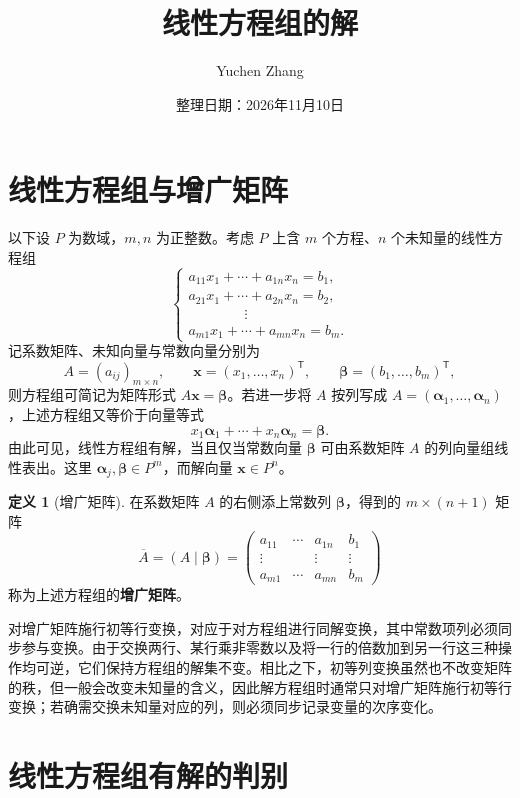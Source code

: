 \documentclass[UTF8, fontset=fandol, a4paper, 12pt]{ctexart}
\title{线性方程组的解}
\author{Yuchen Zhang}
\date{整理日期：2026年11月10日}
\makeatletter
\newcommand{\vx}{\boldsymbol{x}}
\newcommand{\vb}{\boldsymbol{\beta}}
\newcommand{\va}{\boldsymbol{\alpha}}
\theoremstyle{definition}
\newtheorem{definition}{定义}[section]
\renewcommand{\maketitle}{%
  \begin{center}
    {\LARGE\bfseries \@title\par}\vspace{0.6em}
    \@author\par\vspace{0.2em}
    {\small \@date\par}
  \end{center}
}
\makeatother
\begin{document}
\maketitle

\section{线性方程组与增广矩阵}

以下设 $P$ 为数域，$m,n$ 为正整数。考虑 $P$ 上含 $m$ 个方程、$n$ 个未知量的线性方程组
\begin{equation}\label{eq:system}
 \begin{cases}
 a_{11}x_1+\cdots+a_{1n}x_n=b_1,\\
 a_{21}x_1+\cdots+a_{2n}x_n=b_2,\\
 \hspace{4em}\vdots\\
 a_{m1}x_1+\cdots+a_{mn}x_n=b_m.
 \end{cases}
\end{equation}
记系数矩阵、未知向量与常数向量分别为
\[
 A=(a_{ij})_{m\times n},\qquad
 \vx=(x_1,\ldots,x_n)^{\mathsf T},\qquad
 \vb=(b_1,\ldots,b_m)^{\mathsf T},
\]
则方程组可简记为矩阵形式 $A\vx=\vb$。若进一步将 $A$ 按列写成 $A=(\va_1,\ldots,\va_n)$，上述方程组又等价于向量等式
\[
 x_1\va_1+\cdots+x_n\va_n=\vb.
\]
由此可见，线性方程组有解，当且仅当常数向量 $\vb$ 可由系数矩阵 $A$ 的列向量组线性表出。这里 $\va_j,\vb\in P^m$，而解向量 $\vx\in P^n$。

\begin{definition}[增广矩阵]
在系数矩阵 $A$ 的右侧添上常数列 $\vb$，得到的 $m\times(n+1)$ 矩阵
\[
 \overline A=(A\mid\vb)
 =\left(\begin{array}{ccc|c}
 a_{11}&\cdots&a_{1n}&b_1\\
 \vdots&&\vdots&\vdots\\
 a_{m1}&\cdots&a_{mn}&b_m
 \end{array}\right)
\]
称为上述方程组的\textbf{增广矩阵}。
\end{definition}

对增广矩阵施行初等行变换，对应于对方程组进行同解变换，其中常数项列必须同步参与变换。由于交换两行、某行乘非零数以及将一行的倍数加到另一行这三种操作均可逆，它们保持方程组的解集不变。相比之下，初等列变换虽然也不改变矩阵的秩，但一般会改变未知量的含义，因此解方程组时通常只对增广矩阵施行初等行变换；若确需交换未知量对应的列，则必须同步记录变量的次序变化。

\section{线性方程组有解的判别}
\end{document}
